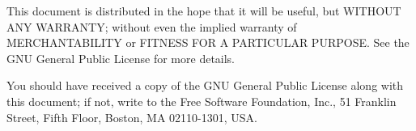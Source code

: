 \documentclass[a4paper,10pt]{book}
\newcommand{\ind}[1]{\begin{latexonly}\index{#1}\end{latexonly}}
\newcommand{\makesection}[2]{ \aname{#1}{} \section{\ahrefloc{#1}{#2}} \label{#1} }
\newcommand{\bracehack}{\def\{{\char"7B}\def\}{\char"7D}}
\newcommand{\titem}[1]{\item[\bracehack\texttt{#1}]}
\newcommand{\Jabber}{Jabber}
\newcommand{\XMPP}{XMPP}
\begin{document}
This document is distributed in the hope that it will be useful,
but WITHOUT ANY WARRANTY; without even the implied warranty of
MERCHANTABILITY or FITNESS FOR A PARTICULAR PURPOSE. See the
GNU General Public License for more details.

You should have received a copy of the GNU General Public License along with
this document; if not, write to the Free Software Foundation, Inc., 51 Franklin
Street, Fifth Floor, Boston, MA 02110-1301, USA.






\begin{latexonly}
\printindex
\end{latexonly}
\end{document}
